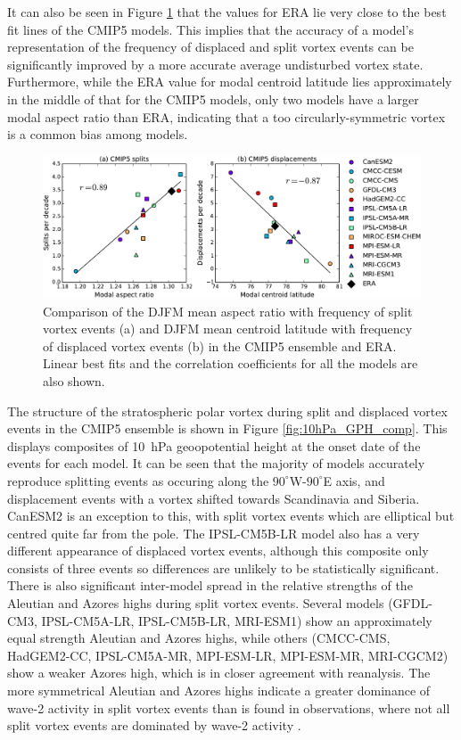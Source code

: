 It can also be seen in Figure \ref{fig:cmip5_moments_scatter} that the values
for ERA lie very close to the best fit lines of the CMIP5 models. This implies
that the accuracy of a model's representation of the frequency of displaced and
split vortex events can be significantly improved by a more accurate average
undisturbed vortex state. Furthermore, while the ERA value for modal centroid
latitude lies approximately in the middle of that for the CMIP5 models, only two
models have a larger modal aspect ratio than ERA, indicating that a too
circularly-symmetric vortex is a common bias among models.

\begin{figure}
 \centering
 \noindent\includegraphics[width=\textwidth]{figures/chapter-models/CMIP5_moments_scatter.pdf}
 \caption[Comparison of moment diagnostics and frequency of split and displaced
 vortex events.]{Comparison of the DJFM mean aspect ratio with frequency of
   split vortex events (a) and DJFM mean centroid latitude with frequency of
   displaced vortex events (b) in the CMIP5 ensemble and ERA. Linear best fits
   and the correlation coefficients for all the models are also shown.}
 \label{fig:cmip5_moments_scatter}
\end{figure}

The structure of the stratospheric polar vortex during split and displaced
vortex events in the CMIP5 ensemble is shown in Figure
\ref{fig:10hPa_GPH_comp}. This displays composites of 10~hPa geoopotential
height at the onset date of the events for each model. It can be seen that the
majority of models accurately reproduce splitting events as occuring along the
$90^{\circ}$W-$90^{\circ}$E axis, and displacement events with a vortex shifted
towards Scandinavia and Siberia. CanESM2 is an exception to this, with split
vortex events which are elliptical but centred quite far from the pole. The
IPSL-CM5B-LR model also has a very different appearance of displaced vortex
events, although this composite only consists of three events so differences are
unlikely to be statistically significant. There is also significant inter-model
spread in the relative strengths of the Aleutian and Azores highs during split
vortex events. Several models (GFDL-CM3, IPSL-CM5A-LR, IPSL-CM5B-LR, MRI-ESM1)
show an approximately equal strength Aleutian and Azores highs, while others
(CMCC-CMS, HadGEM2-CC, IPSL-CM5A-MR, MPI-ESM-LR, MPI-ESM-MR, MRI-CGCM2) show a
weaker Azores high, which is in closer agreement with reanalysis. The more
symmetrical Aleutian and Azores highs indicate a greater dominance of wave-2
activity in split vortex events than is found in observations, where not all
split vortex events are dominated by wave-2 activity \citep{Mitchell2013}.

